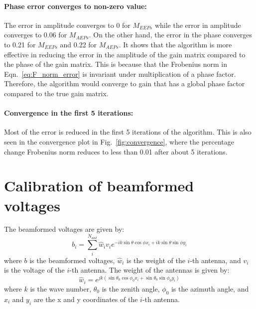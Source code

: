 \documentclass[10pt,a4paper,twocolumn]{paper}
\begin{document}
\paragraph*{Phase error converges to non-zero value:}
The error in amplitude converges to 0 for $M_{EEPs}$ while the error in amplitude converges to 0.06 for $M_{AEPs}$. On the other hand, the error in the phase converges to 0.21 for $M_{EEPs}$ and 0.22 for $M_{AEPs}$.
It shows that the algorithm is more effective in reducing the error in the amplitude of the gain matrix compared to the phase of the gain matrix. This is because that the Frobenius norm in Eqn.~\ref{eq:F_norm_error} is invariant under multiplication of a phase factor. Therefore, the algorithm would converge to gain that has a global phase factor compared to the true gain matrix.

\paragraph*{Convergence in the first 5 iterations:}
Most of the error is reduced in the first 5 iterations of the algorithm. This is also seen in the convergence plot in Fig.~\ref{fig:convergence}, where the percentage change Frobenius norm reduces to less than 0.01 after about 5 iterations.

\section{Calibration of beamformed voltages}
The beamformed voltages are given by:
\begin{equation}
    b_i = \sum_{i}^{N_{ant}} \hat{w}_i v_i e^{-ik\sin\theta\cos\phi x_i + ik\sin\theta\sin\phi y_i}
    \label{eq:beamformed_voltages}
\end{equation}
where $b$ is the beamformed voltages, $\hat{w}_i$ is the weight of the $i$-th antenna, and $v_i$ is the voltage of the $i$-th antenna.
The weight of the antennas is given by:
\begin{equation}
    \hat{w}_i = e^{jk(\sin\theta_0 \cos\phi_0 x_i + \sin\theta_0 \sin\phi_0 y_i)}
    \label{eq:weight}
\end{equation}
where $k$ is the wave number, $\theta_0$ is the zenith angle, $\phi_0$ is the azimuth angle, and $x_i$ and $y_i$ are the x and y coordinates of the $i$-th antenna.
\end{document}
